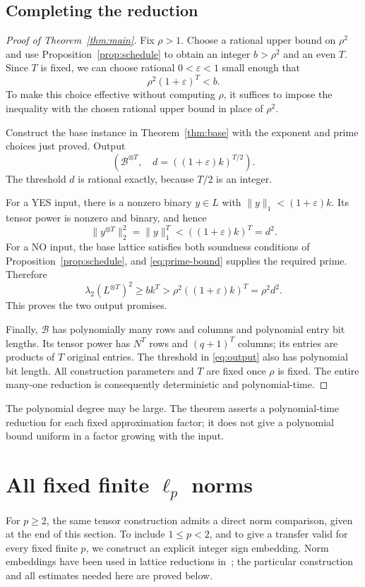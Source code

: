\documentclass[11pt,letterpaper]{article}
\numberwithin{equation}{section}
\theoremstyle{definition}
\theoremstyle{remark}
\newcommand{\cB}{\mathcal B}
\begin{document}
\subsection{Completing the reduction}
\begin{proof}[Proof of Theorem~\ref{thm:main}]
Fix $\rho>1$. Choose a rational upper bound on $\rho^2$ and use Proposition~\ref{prop:schedule} to obtain an integer $b>\rho^2$ and an even $T$. Since $T$ is fixed, we can choose rational $0<\varepsilon<1$ small enough that
\begin{equation}\label{eq:epsilon-choice}
 \rho^2(1+\varepsilon)^T<b.
\end{equation}
To make this choice effective without computing $\rho$, it suffices to impose the inequality with the chosen rational upper bound in place of $\rho^2$.

Construct the base instance in Theorem~\ref{thm:base} with the exponent and prime choices just proved. Output
\begin{equation}\label{eq:output}
 \left(\cB^{\otimes T},\quad d=((1+\varepsilon)k)^{T/2}\right).
\end{equation}
The threshold $d$ is rational exactly, because $T/2$ is an integer.

For a YES input, there is a nonzero binary $y\in L$ with $\|y\|_1<(1+\varepsilon)k$. Its tensor power is nonzero and binary, and hence
\[
 \|y^{\otimes T}\|_2^2=\|y\|_1^T
 <((1+\varepsilon)k)^T=d^2.
\]
For a NO input, the base lattice satisfies both soundness conditions of Proposition~\ref{prop:schedule}, and \eqref{eq:prime-bound} supplies the required prime. Therefore
\[
 \lambda_2(L^{\otimes T})^2\ge bk^T
 >\rho^2((1+\varepsilon)k)^T=\rho^2d^2.
\]
This proves the two output promises.

Finally, $\cB$ has polynomially many rows and columns and polynomial entry bit lengths. Its tensor power has $N^T$ rows and $(q+1)^T$ columns; its entries are products of $T$ original entries. The threshold in \eqref{eq:output} also has polynomial bit length. All construction parameters and $T$ are fixed once $\rho$ is fixed. The entire many-one reduction is consequently deterministic and polynomial-time.
\end{proof}

The polynomial degree may be large. The theorem asserts a polynomial-time reduction for each fixed approximation factor; it does not give a polynomial bound uniform in a factor growing with the input.

\section{All fixed finite \texorpdfstring{$\ell_p$}{lp} norms}\label{sec:norms}
For $p\ge2$, the same tensor construction admits a direct norm comparison, given at the end of this section. To include $1\le p<2$, and to give a transfer valid for every fixed finite $p$, we construct an explicit integer sign embedding. Norm embeddings have been used in lattice reductions in~\cite{rr}; the particular construction and all estimates needed here are proved below.
\end{document}
